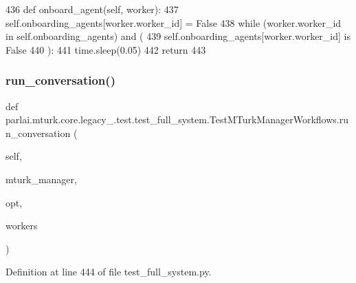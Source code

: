 \begin{DoxyCode}
436     \textcolor{keyword}{def }onboard\_agent(self, worker):
437         self.onboarding\_agents[worker.worker\_id] = \textcolor{keyword}{False}
438         \textcolor{keywordflow}{while} (worker.worker\_id \textcolor{keywordflow}{in} self.onboarding\_agents) \textcolor{keywordflow}{and} (
439             self.onboarding\_agents[worker.worker\_id] \textcolor{keywordflow}{is} \textcolor{keyword}{False}
440         ):
441             time.sleep(0.05)
442         \textcolor{keywordflow}{return}
443 
\end{DoxyCode}
\mbox{\label{classparlai_1_1mturk_1_1core_1_1legacy__2018_1_1test_1_1test__full__system_1_1TestMTurkManagerWorkflows_a0441bae10079f6823a36126581caba48}} 
\subsubsection{\texorpdfstring{run\+\_\+conversation()}{run\_conversation()}}
{\footnotesize\ttfamily def parlai.\+mturk.\+core.\+legacy\+\_.\+test.\+test\+\_\+full\+\_\+system.\+Test\+M\+Turk\+Manager\+Workflows.\+run\+\_\+conversation (\begin{DoxyParamCaption}\item[{}]{self,  }\item[{}]{mturk\+\_\+manager,  }\item[{}]{opt,  }\item[{}]{workers }\end{DoxyParamCaption})}



Definition at line 444 of file test\+\_\+full\+\_\+system.\+py.


